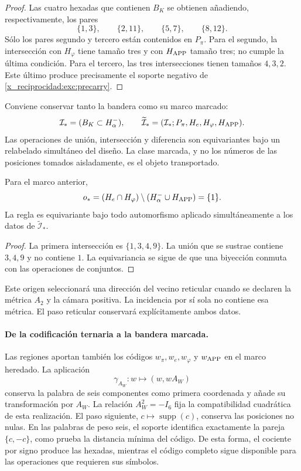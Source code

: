 \begin{proof}
Las cuatro hexadas que contienen $B_K$ se obtienen añadiendo,
respectivamente, los pares
\[
 \{1,3\},\qquad\{2,11\},\qquad\{5,7\},\qquad\{8,12\}.
\]
Sólo los pares segundo y tercero están contenidos en $P_\pi$. Para el
segundo, la intersección con $H_\varphi$ tiene tamaño tres y con
$H_{\rm APP}$ tamaño tres; no cumple la última condición. Para el
tercero, las tres intersecciones tienen tamaños $4,3,2$. Este último
produce precisamente el soporte negativo de \eqref{x_reciprocidad:exc:precarry}.
\end{proof}

Conviene conservar tanto la bandera como su marco marcado:
\[
 \mathcal I_*=(B_K\subset H^-_\alpha),\qquad
 \widetilde{\mathcal I}_*
   =(\mathcal I_*;P_\pi,H_e,H_\varphi,H_{\rm APP}).
\]
Las operaciones de unión, intersección y diferencia son equivariantes
bajo un relabelado simultáneo del diseño. La clase marcada, y no los
números de las posiciones tomados aisladamente, es el objeto transportado.

\begin{lemma}
\label{x_reciprocidad:exc:origen}
Para el marco anterior,
\[
 o_*=(H_e\cap H_\varphi)
           \setminus(H^-_\alpha\cup H_{\rm APP})=\{1\}.
\]
La regla es equivariante bajo todo automorfismo aplicado simultáneamente
a los datos de $\widetilde{\mathcal I}_*$.
\end{lemma}

\begin{proof}
La primera intersección es $\{1,3,4,9\}$. La unión que se sustrae
contiene $3,4,9$ y no contiene $1$. La equivariancia se sigue de que una
biyección conmuta con las operaciones de conjuntos.
\end{proof}

Este origen seleccionará una dirección del vecino reticular cuando se
declaren la métrica $A_2$ y la cámara positiva. La incidencia por sí sola
no contiene esa métrica. El paso reticular conservará explícitamente
ambos datos.


\paragraph{De la codificación ternaria a la bandera marcada.}
\label{x_reciprocidad:inc-ampl-bandera}
Las regiones aportan también los códigos $w_\pi,w_e,w_\varphi$ y
$w_{\rm APP}$ en el marco heredado. La aplicación
\[
 \gamma_{A_W}:w\longmapsto(w,wA_W)
\]
conserva la palabra de seis componentes como primera coordenada y añade
su transformación por $A_W$. La relación $A_W^2=-I_6$ fija la
compatibilidad cuadrática de esta realización. El paso siguiente,
$c\mapsto\operatorname{supp}(c)$, conserva las posiciones no nulas.
En las palabras de peso seis, el soporte identifica exactamente la pareja
$\{c,-c\}$, como prueba la distancia mínima del código. De esta forma,
el cociente por signo produce las hexadas, mientras el código completo
sigue disponible para las operaciones que requieren sus símbolos.

